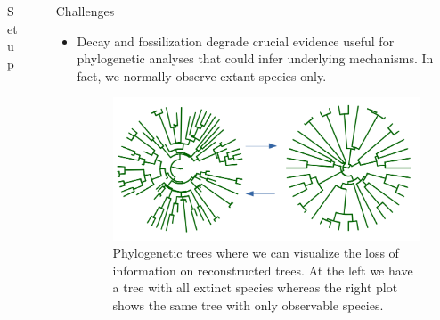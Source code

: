\documentclass[final]{beamer}
\newlength{\sepwid}
\newlength{\onecolwid}
\begin{document}
\begin{frame}[t]
\begin{columns}[t]
\begin{column}{\onecolwid}
\begin{block}{Set up}
          \end{block}     
                \end{column}
                  
                  
                  
         \begin{column}{\sepwid}  \end{column}
         
         
         
         
         \begin{column}{\onecolwid} %
          
     \begin{block}{Challenges}
     
     
     \begin{itemize}
     
     \item Decay and fossilization degrade crucial evidence useful for phylogenetic analyses that could infer underlying mechanisms. In fact, we normally observe extant species only.

	
\begin{figure}
                    \includegraphics[width=1\linewidth]{figures/treesa2.png}
                    \caption{Phylogenetic trees where we can visualize the loss of information on reconstructed trees. At the left we have a tree with all extinct species whereas the right plot shows the same tree with only observable species.}
				\end{figure}
     

\end{itemize}
\end{block}
\end{column}
\end{columns}
\end{frame}
\end{document}
